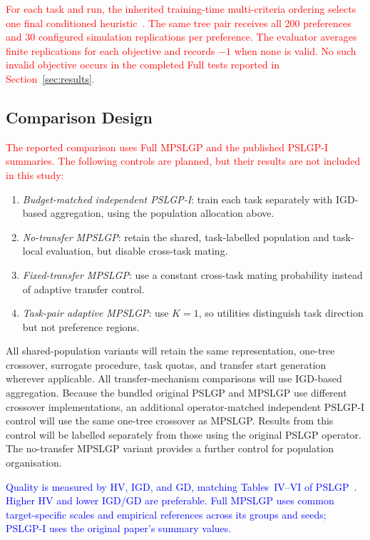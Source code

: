 \documentclass[10pt,journal]{IEEEtran}
\newcommand{\revision}[1]{\textcolor{blue}{#1}}
\newcommand{\ablationrevision}[1]{\textcolor{red}{#1}}
\begin{document}
\ablationrevision{For each task and run, the inherited training-time multi-criteria ordering selects one final conditioned heuristic~\cite{xu2026pslgp}. The same tree pair receives all 200 preferences and 30 configured simulation replications per preference. The evaluator averages finite replications for each objective and records $-1$ when none is valid. No such invalid objective occurs in the completed Full tests reported in Section~\ref{sec:results}.}

\subsection{Comparison Design}
\ablationrevision{The reported comparison uses Full MPSLGP and the published PSLGP-I summaries. The following controls are planned, but their results are not included in this study:}
\begin{enumerate}[leftmargin=*,nosep]
    \item \emph{Budget-matched independent PSLGP-I}: train each task separately with IGD-based aggregation, using the population allocation above.
    \item \emph{No-transfer MPSLGP}: retain the shared, task-labelled population and task-local evaluation, but disable cross-task mating.
    \item \emph{Fixed-transfer MPSLGP}: use a constant cross-task mating probability instead of adaptive transfer control.
    \item \emph{Task-pair adaptive MPSLGP}: use $K=1$, so utilities distinguish task direction but not preference regions.
\end{enumerate}
All shared-population variants will retain the same representation, one-tree crossover, surrogate procedure, task quotas, and transfer start generation wherever applicable. All transfer-mechanism comparisons will use IGD-based aggregation. Because the bundled original PSLGP and MPSLGP use different crossover implementations, an additional operator-matched independent PSLGP-I control will use the same one-tree crossover as MPSLGP. Results from this control will be labelled separately from those using the original PSLGP operator. The no-transfer MPSLGP variant provides a further control for population organisation.

\revision{Quality is measured by HV, IGD, and GD, matching Tables~IV--VI of PSLGP~\cite{xu2026pslgp}. Higher HV and lower IGD/GD are preferable. Full MPSLGP uses common target-specific scales and empirical references across its groups and seeds; PSLGP-I uses the original paper's summary values.}
\end{document}

